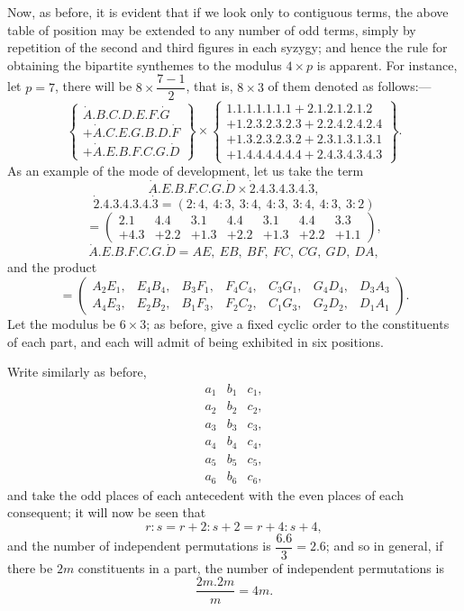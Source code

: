 \documentclass[11pt]{article}
\newcommand{\sourcepage}[1]{\marginpar{\scriptsize p.~#1}}
\newcommand{\dotter}[1]{\dot{#1}}
\begin{document}
\sourcepage{99}
Now, as before, it is evident that if we look only to contiguous terms, the above table of position may be extended to any number of odd terms, simply by repetition of the second and third figures in each syzygy; and hence the rule for obtaining the bipartite synthemes to the modulus $4\times p$ is apparent. For instance, let $p=7$, there will be $8\times\dfrac{7-1}{2}$, that is, $8\times3$ of them denoted as follows:---
\[
\left\{\begin{array}{l}
\dotter A.B.C.D.E.F.\dotter G\\
+\dotter A.C.E.G.B.D.\dotter F\\
+\dotter A.E.B.F.C.G.\dotter D
\end{array}\right\}
\times
\left\{\begin{array}{l}
1.1.1.1.1.1.1+2.1.2.1.2.1.2\\
+1.2.3.2.3.2.3+2.2.4.2.4.2.4\\
+1.3.2.3.2.3.2+2.3.1.3.1.3.1\\
+1.4.4.4.4.4.4+2.4.3.4.3.4.3
\end{array}\right\}.
\]
As an example of the mode of development, let us take the term
\[
\dotter A.E.B.F.C.G.\dotter D\times \dotter2.4.3.4.3.4.\dotter3,
\]
\[
\dotter2.4.3.4.3.4.\dotter3=(2:4,\ 4:3,\ 3:4,\ 4:3,\ 3:4,\ 4:3,\ 3:2)
\]
\[
=\left(\begin{array}{ccccccc}
2.1&4.4&3.1&4.4&3.1&4.4&3.3\\
+4.3&+2.2&+1.3&+2.2&+1.3&+2.2&+1.1
\end{array}\right),
\]
\[
\dotter A.E.B.F.C.G.\dotter D=AE,\ EB,\ BF,\ FC,\ CG,\ GD,\ DA,
\]
and the product
\[
=\left(\begin{array}{lllllll}
A_2E_1,&E_4B_4,&B_3F_1,&F_4C_4,&C_3G_1,&G_4D_4,&D_3A_3\\
A_4E_3,&E_2B_2,&B_1F_3,&F_2C_2,&C_1G_3,&G_2D_2,&D_1A_1
\end{array}\right).
\]
Let the modulus be $6\times3$; as before, give a fixed cyclic order to the constituents of each part, and each will admit of being exhibited in six positions.

Write similarly as before,
\[
\begin{array}{lll}
a_1&b_1&c_1,\\
a_2&b_2&c_2,\\
a_3&b_3&c_3,\\
a_4&b_4&c_4,\\
a_5&b_5&c_5,\\
a_6&b_6&c_6,
\end{array}
\]
and take the odd places of each antecedent with the even places of each consequent; it will now be seen that
\[
r:s=r+2:s+2=r+4:s+4,
\]
and the number of independent permutations is $\dfrac{6.6}{3}=2.6$; and so in general, if there be $2m$ constituents in a part, the number of independent permutations is
\[
\frac{2m.2m}{m}=4m.
\]
\end{document}
